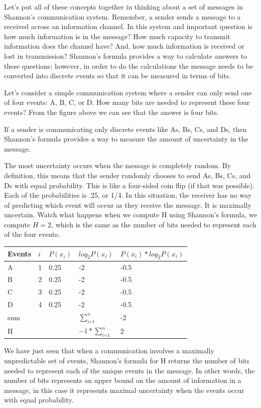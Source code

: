 \documentclass[
  oneside,
  12pt]{crumpbook}
\begin{document}
Let's put all of these concepts together in thinking about a set of messages in Shannon's communication system. Remember, a sender sends a message to a received across an information channel. In this system and important question is how much information is in the message? How much capacity to transmit information does the channel have? And, how much information is received or lost in transmission? Shannon's formula provides a way to calculate answers to these questions; however, in order to do the calculations the message needs to be converted into discrete events so that it can be measured in terms of bits.

Let's consider a simple communication system where a sender can only send one of four events: A, B, C, or D. How many bits are needed to represent these four events? From the figure above we can see that the answer is four bits.

If a sender is communicating only discrete events like As, Bs, Cs, and Ds, then Shannon's formula provides a way to measure the amount of uncertainty in the message.

The most uncertainty occurs when the message is completely random. By definition, this means that the sender randomly chooses to send As, Bs, Cs, and Ds with equal probability. This is like a four-sided coin flip (if that was possible). Each of the probabilities is .25, or 1/4. In this situation, the receiver has no way of predicting which event will occur as they receive the message. It is maximally uncertain. Watch what happens when we compute H using Shannon's formula, we compute \(H = 2\), which is the same as the number of bits needed to represent each of the four events:

\begin{tabular}{l|l|l|l|l}
\hline
Events & $i$ & $P(x_i)$ & $log_2 P(x_i)$ & $P(x_i)*log_2 P(x_i)$\\
\hline
A & 1 & 0.25 & -2 & -0.5\\
\hline
B & 2 & 0.25 & -2 & -0.5\\
\hline
C & 3 & 0.25 & -2 & -0.5\\
\hline
D & 4 & 0.25 & -2 & -0.5\\
\hline
sum &  &  & $\sum_\text{i=1}^n$ & -2\\
\hline
H &  &  & $-1*\sum_\text{i=1}^n$ & 2\\
\hline
\end{tabular}

We have just seen that when a communication involves a maximally unpredictable set of events, Shannon's formula for H returns the number of bits needed to represent each of the unique events in the message. In other words, the number of bits represents an upper bound on the amount of information in a message, in this case it represents maximal uncertainty when the events occur with equal probability.
\end{document}
